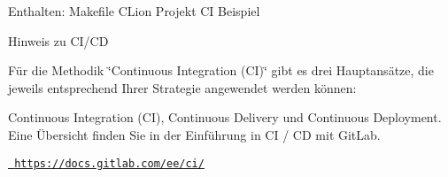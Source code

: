 Enthalten\+: Makefile CLion Projekt CI Beispiel

Hinweis zu CI/\+CD

Für die Methodik \char`\"{}\+Continuous Integration (\+CI)\char`\"{} gibt es drei Hauptansätze, die jeweils entsprechend Ihrer Strategie angewendet werden können\+:

Continuous Integration (CI), Continuous Delivery und Continuous Deployment. Eine Übersicht finden Sie in der Einführung in CI / CD mit Git\+Lab.

\href{https://docs.gitlab.com/ee/ci/}{\texttt{ https\+://docs.\+gitlab.\+com/ee/ci/}} 